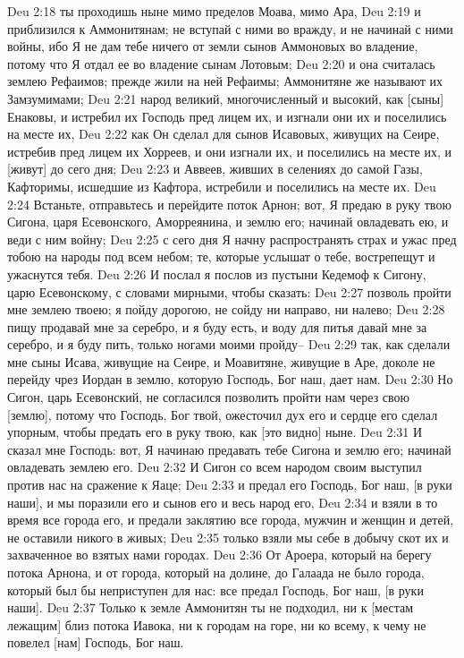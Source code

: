 Deu 2:18  ты проходишь ныне мимо пределов Моава, мимо Ара,
Deu 2:19  и приблизился к Аммонитянам; не вступай с ними во вражду, и не начинай с ними войны, ибо Я не дам тебе ничего от земли сынов Аммоновых во владение, потому что Я отдал ее во владение сынам Лотовым;
Deu 2:20  и она считалась землею Рефаимов; прежде жили на ней Рефаимы; Аммонитяне же называют их Замзумимами;
Deu 2:21  народ великий, многочисленный и высокий, как [сыны] Енаковы, и истребил их Господь пред лицем их, и изгнали они их и поселились на месте их,
Deu 2:22  как Он сделал для сынов Исавовых, живущих на Сеире, истребив пред лицем их Хорреев, и они изгнали их, и поселились на месте их, и [живут] до сего дня;
Deu 2:23  и Аввеев, живших в селениях до самой Газы, Кафторимы, исшедшие из Кафтора, истребили и поселились на месте их.
Deu 2:24  Встаньте, отправьтесь и перейдите поток Арнон; вот, Я предаю в руку твою Сигона, царя Есевонского, Аморреянина, и землю его; начинай овладевать ею, и веди с ним войну;
Deu 2:25  с сего дня Я начну распространять страх и ужас пред тобою на народы под всем небом; те, которые услышат о тебе, вострепещут и ужаснутся тебя.
Deu 2:26  И послал я послов из пустыни Кедемоф к Сигону, царю Есевонскому, с словами мирными, чтобы сказать:
Deu 2:27  позволь пройти мне землею твоею; я пойду дорогою, не сойду ни направо, ни налево;
Deu 2:28  пищу продавай мне за серебро, и я буду есть, и воду для питья давай мне за серебро, и я буду пить, только ногами моими пройду--
Deu 2:29  так, как сделали мне сыны Исава, живущие на Сеире, и Моавитяне, живущие в Аре, доколе не перейду чрез Иордан в землю, которую Господь, Бог наш, дает нам.
Deu 2:30  Но Сигон, царь Есевонский, не согласился позволить пройти нам через свою [землю], потому что Господь, Бог твой, ожесточил дух его и сердце его сделал упорным, чтобы предать его в руку твою, как [это видно] ныне.
Deu 2:31  И сказал мне Господь: вот, Я начинаю предавать тебе Сигона и землю его; начинай овладевать землею его.
Deu 2:32  И Сигон со всем народом своим выступил против нас на сражение к Яаце;
Deu 2:33  и предал его Господь, Бог наш, [в руки наши], и мы поразили его и сынов его и весь народ его,
Deu 2:34  и взяли в то время все города его, и предали заклятию все города, мужчин и женщин и детей, не оставили никого в живых;
Deu 2:35  только взяли мы себе в добычу скот их и захваченное во взятых нами городах.
Deu 2:36  От Ароера, который на берегу потока Арнона, и от города, который на долине, до Галаада не было города, который был бы неприступен для нас: все предал Господь, Бог наш, [в руки наши].
Deu 2:37  Только к земле Аммонитян ты не подходил, ни к [местам лежащим] близ потока Иавока, ни к городам на горе, ни ко всему, к чему не повелел [нам] Господь, Бог наш.

